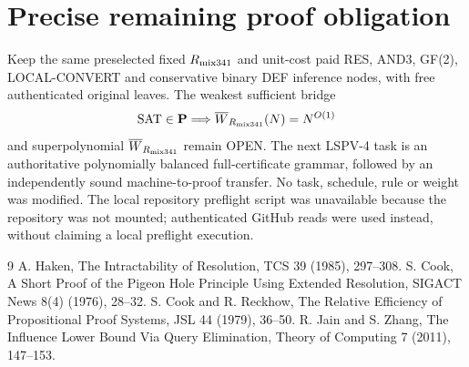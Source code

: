 \documentclass[11pt]{article}
\begin{document}
\section*{Precise remaining proof obligation}
Keep the same preselected fixed $R_{\rm mix341}$ and unit-cost paid RES, AND3, GF(2), LOCAL-CONVERT and conservative binary DEF inference nodes, with free authenticated original leaves. The weakest sufficient bridge
\[
\mathrm{SAT}\in\mathbf P\Longrightarrow \overline W_{R_{\rm mix341}}(N)=N^{O(1)}
\]
and superpolynomial $\overline W_{R_{\rm mix341}}$ remain OPEN. The next LSPV-4 task is an authoritative polynomially balanced full-certificate grammar, followed by an independently sound machine-to-proof transfer. No task, schedule, rule or weight was modified. The local repository preflight script was unavailable because the repository was not mounted; authenticated GitHub reads were used instead, without claiming a local preflight execution.
\begin{thebibliography}{9}
 A. Haken, The Intractability of Resolution, TCS 39 (1985), 297--308.
 S. Cook, A Short Proof of the Pigeon Hole Principle Using Extended Resolution, SIGACT News 8(4) (1976), 28--32.
 S. Cook and R. Reckhow, The Relative Efficiency of Propositional Proof Systems, JSL 44 (1979), 36--50.
 R. Jain and S. Zhang, The Influence Lower Bound Via Query Elimination, Theory of Computing 7 (2011), 147--153.
\end{thebibliography}
\end{document}
